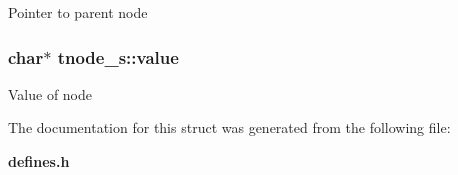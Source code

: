 Pointer to parent node 
\subsubsection{\setlength{\rightskip}{0pt plus 5cm}char$\ast$ tnode\_\-s::value}\label{structtnode__s_m1}


Value of node 

The documentation for this struct was generated from the following file:\begin{CompactItemize}
\item 
{\bf defines.h}\end{CompactItemize}
